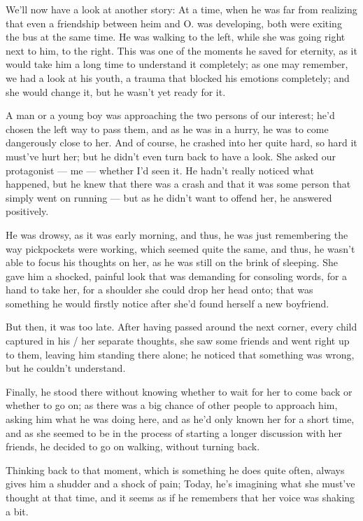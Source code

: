 We'll now have a look at another story: At a time, when he was far from realizing that even a friendship between heim and O. was developing, both were exiting the bus at the same time. He was walking to the left, while she was going right next to him, to the right. This was one of the moments he saved for eternity, as it would take him a long time to understand it completely; as one may remember, we had a look at his youth, a trauma that blocked his emotions completely; and she would change it, but he wasn't yet ready for it.

A man or a young boy was approaching the two persons of our interest; he'd chosen the left way to pass them, and as he was in a hurry, he was to come dangerously close to her. 
And of course, he crashed into her quite hard, so hard it must've hurt her; but he didn't even turn back to have a look. 
She asked our protagonist --- me --- whether I'd seen it. 
He hadn't really noticed what happened, but he knew that there was a crash and that it was some person that simply went on running --- but as he didn't want to offend her, he answered positively.

He was drowsy, as it was early morning, and thus, he was just remembering the way pickpockets were working, which seemed quite the same, and thus, he wasn't able to focus his thoughts on her, as he was still on the brink of sleeping. 
She gave him a shocked, painful look that was demanding for consoling words, for a hand to take her, for a shoulder she could drop her head onto; that was something he would firstly notice after she'd found herself a new boyfriend.

But then, it was too late. 
After having passed around the next corner, every child captured in his / her separate thoughts, she saw some friends and went right up to them, leaving him standing there alone; he noticed that something was wrong, but he couldn't understand.

Finally, he stood there without knowing whether to wait for her to come back or whether to go on; as there was a big chance of other people to approach him, asking him what he was doing here, and as he'd only known her for a short time, and as she seemed to be in the process of starting a longer discussion with her friends, he decided to go on walking, without turning back.

Thinking back to that moment, which is something he does quite often, always gives him a shudder and a shock of pain; Today, he's imagining what she must've thought at that time, and it seems as if he remembers that her voice was shaking a bit.

